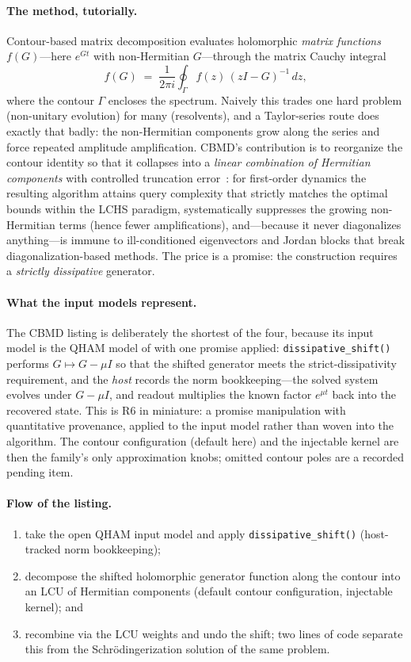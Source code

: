\paragraph{The method, tutorially.}
Contour-based matrix decomposition evaluates holomorphic \emph{matrix
functions} $f(G)$---here $e^{Gt}$ with non-Hermitian $G$---through the
matrix Cauchy integral
\[
f(G) \;=\; \frac{1}{2\pi i} \oint_\Gamma f(z)\,(zI-G)^{-1}\,dz ,
\]
where the contour $\Gamma$ encloses the spectrum.  Naively this trades
one hard problem (non-unitary evolution) for many (resolvents), and a
Taylor-series route does exactly that badly: the non-Hermitian components
grow along the series and force repeated amplitude amplification.  CBMD's
contribution is to reorganize the contour identity so that it collapses
into a \emph{linear combination of Hermitian
components} with controlled truncation error~\cite{wang2026cbmd}: for
first-order dynamics the resulting algorithm attains query complexity
that strictly matches the optimal bounds within the LCHS paradigm,
systematically suppresses the growing non-Hermitian terms (hence fewer
amplifications), and---because it never diagonalizes anything---is immune
to ill-conditioned eigenvectors and Jordan blocks that break
diagonalization-based methods.  The price is a promise: the construction
requires a \emph{strictly dissipative} generator.

\paragraph{What the input models represent.}
The CBMD listing is deliberately the shortest of the four, because its
input model is the QHAM model of  with one promise
applied: \texttt{dissipative\_shift()} performs
$G \mapsto G - \mu I$ so that the shifted generator meets the strict-dissipativity
requirement, and the \emph{host} records the norm bookkeeping---the
solved system evolves under $G-\mu I$, and readout multiplies the known
factor $e^{\mu t}$ back into the recovered state.  This is R6 in miniature: a promise
manipulation with quantitative provenance, applied to the input model
rather than woven into the algorithm.  The contour configuration
(default here) and the injectable kernel are then the family's only
approximation knobs; omitted contour poles are a recorded pending item.

\paragraph{Flow of the listing.}
\begin{enumerate}
\item take the open QHAM input model and apply
  \texttt{dissipative\_shift()} (host-tracked norm bookkeeping);
\item decompose the shifted holomorphic generator function along the
  contour into an LCU of Hermitian components (default contour
  configuration, injectable kernel); and
\item recombine via the LCU weights and undo the shift; two lines of code
  separate this from the Schr\"odingerization solution of the same
  problem.
\end{enumerate}

